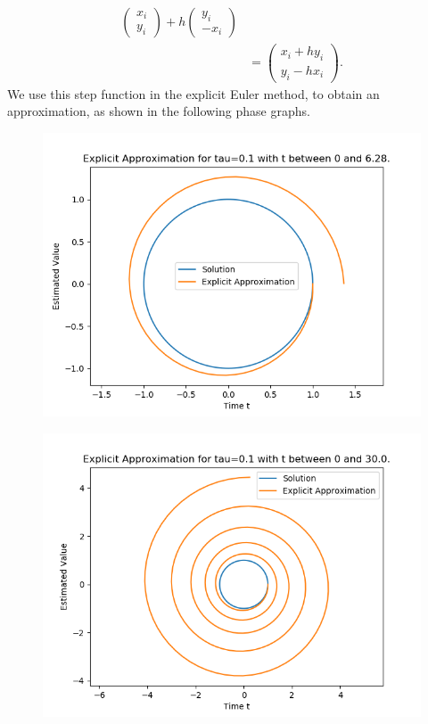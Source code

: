 \documentclass{article}
\begin{document}
\begin{itemize}
\begin{align*}
\begin{pmatrix}
				x_{i} \\
				y_{i}
			\end{pmatrix}
			+ h
			\begin{pmatrix}
				y_{i} \\
				-x_{i}
			\end{pmatrix} \\
			&=
			\begin{pmatrix}
				x_{i} + h y_{i} \\
				y_{i} - h x_{i}
			\end{pmatrix}.
		\end{align*}
		We use this step function in the explicit Euler method, to
		obtain an approximation, as shown in the following phase graphs.

		\begin{figure}[H]
			\includegraphics[scale=0.6]{explicitphase2p}
		\end{figure}
		\begin{figure}[H]
			\includegraphics[scale=0.6]{explicitphase30}
		\end{figure}


\end{itemize}
\end{document}
